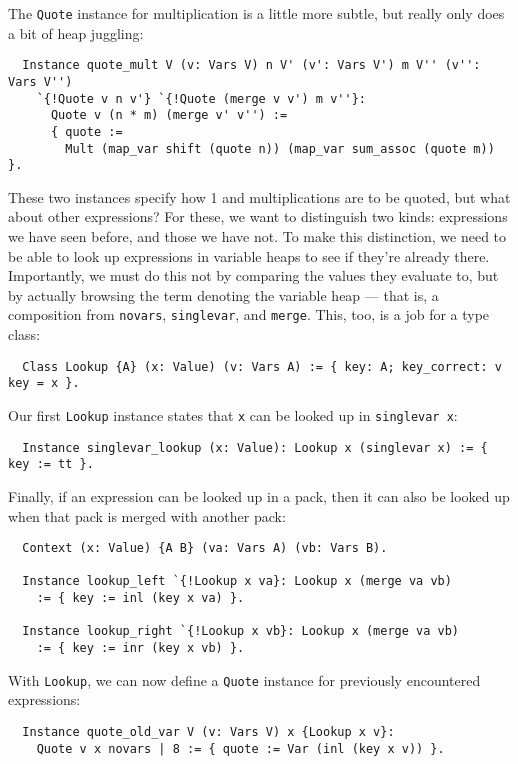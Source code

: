 \documentclass[a4paper,10pt,runningheads]{llncs}
\begin{document}
The \lstinline|Quote| instance for multiplication is a little more subtle, but really only does a bit of heap juggling:
\begin{lstlisting}
  Instance quote_mult V (v: Vars V) n V' (v': Vars V') m V'' (v'': Vars V'')
    `{!Quote v n v'} `{!Quote (merge v v') m v''}:
      Quote v (n * m) (merge v' v'') :=
      { quote :=
        Mult (map_var shift (quote n)) (map_var sum_assoc (quote m)) }.
\end{lstlisting}

These two instances specify how 1 and multiplications are to be quoted, but what about other expressions? For these, we want to distinguish two kinds: expressions we have seen before, and those we have not. To make this distinction, we need to be able to look up expressions in variable heaps to see if they're already there. Importantly, we must do this not by comparing the values they evaluate to, but by actually browsing the term denoting the variable heap --- that is, a composition from \lstinline|novars|, \lstinline|singlevar|, and \lstinline|merge|. This, too, is a job for a type class:
\begin{lstlisting}
  Class Lookup {A} (x: Value) (v: Vars A) := { key: A; key_correct: v key = x }.
\end{lstlisting}
Our first \lstinline|Lookup| instance states that \lstinline|x| can be looked up in \lstinline|singlevar x|:
\begin{lstlisting}
  Instance singlevar_lookup (x: Value): Lookup x (singlevar x) := { key := tt }.
\end{lstlisting}
Finally, if an expression can be looked up in a pack, then it can also be looked up when that pack is merged with another pack:
\begin{lstlisting}
  Context (x: Value) {A B} (va: Vars A) (vb: Vars B).

  Instance lookup_left `{!Lookup x va}: Lookup x (merge va vb)
    := { key := inl (key x va) }.

  Instance lookup_right `{!Lookup x vb}: Lookup x (merge va vb)
    := { key := inr (key x vb) }.
\end{lstlisting}

With \lstinline|Lookup|, we can now define a \lstinline|Quote| instance for previously encountered expressions:
\begin{lstlisting}
  Instance quote_old_var V (v: Vars V) x {Lookup x v}:
    Quote v x novars | 8 := { quote := Var (inl (key x v)) }.
\end{lstlisting}
\end{document}
